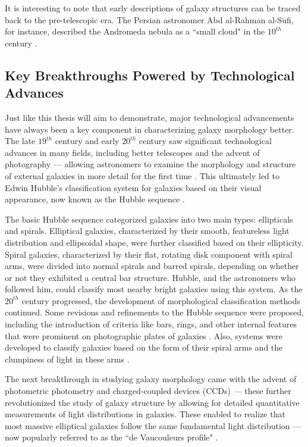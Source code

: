It is interesting to note that early descriptions of galaxy structures can be traced back to the pre-telescopic era. The Persian astronomer Abd al-Rahman al-Sufi, for instance, described the Andromeda nebula as a ``small cloud" in the $10^{th}$ century \citep{kepple_98}. 


\subsection{Key Breakthroughs Powered by Technological Advances} \label{sec_intro:technology}

Just like this thesis will aim to demonstrate, major technological advancements have always been a key component in characterizing galaxy morphology better. The late $19^{th}$ century and early $20^{th}$ century saw significant technological advances in many fields, including better telescopes and the advent of photography ---  allowing astronomers to examine the morphology and structure of external galaxies in more detail for the first time \citep[e.g.,][]{wolf_08,lundmark_26}. This ultimately led to Edwin Hubble's classification system for galaxies based on their visual appearance, now known as the Hubble sequence \citep{hubble_1926}. 

The basic Hubble sequence categorized galaxies into two main types: ellipticals and spirals.  Elliptical galaxies, characterized by their smooth, featureless light distribution and ellipsoidal shape, were further classified based on their ellipticity. Spiral galaxies, characterized by their flat, rotating disk component with spiral arms, were divided into normal spirals and barred spirals, depending on whether or not they exhibited a central bar structure. Hubble, and the astronomers who followed him, could classify most nearby bright galaxies using this system. As the $20^{th}$ century progressed, the development of morphological classification methods continued. Some revisions and refinements to the Hubble sequence were proposed, including the introduction of criteria like bars, rings, and other internal features that were prominent on photographic plates of galaxies \citep[e.g.,][]{devac_59}. Also, systems were developed to classify galaxies based on the form of their spiral arms and the clumpiness of light in these arms \citep[e.g.,][]{vbg_60,vbg_76,elmgreen_87}.

The next breakthrough in studying galaxy morphology came with the advent of photometric photometry and charged-coupled devices (CCDs) --- these further revolutionized the study of galaxy structure by allowing for detailed quantitative measurements of light distributions in galaxies. These enabled \citeauthor{de_vac_48} to realize that most massive elliptical galaxies follow the same fundamental light distribution --- now popularly referred to as the ``de Vaucouleurs profile" \citep{de_vac_48}. 

